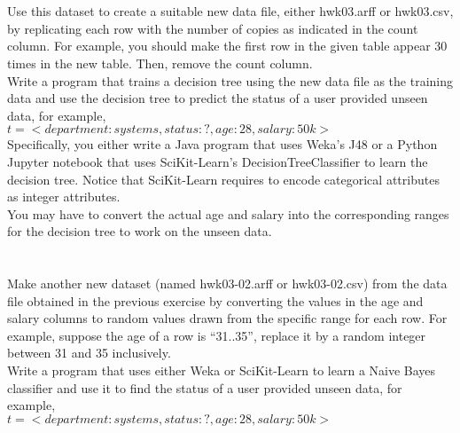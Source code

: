 \documentclass{scrartcl}
\begin{document}
\section{}
Use this dataset to create a suitable new data file, either hwk03.arff or hwk03.csv, by replicating each row with the number of copies as indicated in the count column. For example, you should make the first row in the given table appear 30 times in the new table. Then, remove the count column.\\

Write a program that trains a decision tree using the new data file as the training data and use the decision tree to predict the status of a user provided unseen data, for example,\\

$t = <department: systems, status: ?, age: 28, salary: 50k>$\\

Specifically, you either write a Java program that uses Weka’s J48 or a Python Jupyter notebook that uses SciKit-Learn’s DecisionTreeClassifier to learn the decision tree.  Notice that SciKit-Learn requires to encode categorical attributes as integer attributes.\\

You may have to convert the actual age and salary into the corresponding ranges for the decision tree to work on the unseen data.

\section{}
Make another new dataset (named hwk03-02.arff or hwk03-02.csv) from the data file obtained in the previous exercise by converting the values in the age and salary columns to random values drawn from the specific range for each row. For example, suppose the age of a row is “31..35”, replace it by a random integer between 31 and 35 inclusively.\\

Write a program that uses either Weka or SciKit-Learn to learn a Naive Bayes classifier and use it to find the status of a user provided unseen data, for example,\\

$t = <department: systems, status: ?, age: 28, salary: 50k>$
\end{document}
